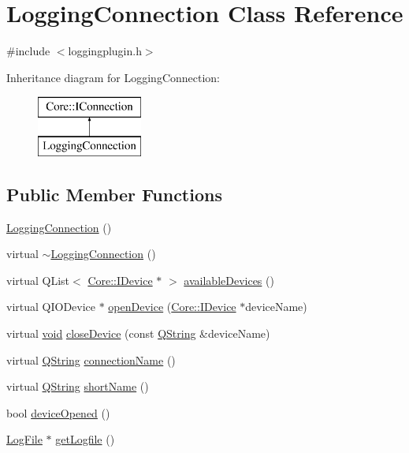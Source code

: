 \hypertarget{class_logging_connection}{\section{\-Logging\-Connection \-Class \-Reference}
\label{class_logging_connection}
}


{\ttfamily \#include $<$loggingplugin.\-h$>$}

\-Inheritance diagram for \-Logging\-Connection\-:\begin{figure}[H]
\begin{center}
\leavevmode
\includegraphics[height=2.000000cm]{class_logging_connection}
\end{center}
\end{figure}
\subsection*{\-Public \-Member \-Functions}
\begin{DoxyCompactItemize}
\item 
\hyperlink{group___logging_ga4e4cd5c90f83710ae2807a8257db1c70}{\-Logging\-Connection} ()
\item 
virtual \hyperlink{group___logging_ga0d9d6cd072a5b35292b5e4ffeda50fcd}{$\sim$\-Logging\-Connection} ()
\item 
virtual \-Q\-List$<$ \hyperlink{class_core_1_1_i_device}{\-Core\-::\-I\-Device} $\ast$ $>$ \hyperlink{group___logging_ga0ed63dc5111dcd536bacc7655b878e8f}{available\-Devices} ()
\item 
virtual \-Q\-I\-O\-Device $\ast$ \hyperlink{group___logging_ga592075585208489ed59844d9d7175015}{open\-Device} (\hyperlink{class_core_1_1_i_device}{\-Core\-::\-I\-Device} $\ast$device\-Name)
\item 
virtual \hyperlink{group___u_a_v_objects_plugin_ga444cf2ff3f0ecbe028adce838d373f5c}{void} \hyperlink{group___logging_gaeb291639744d4248ab7422d57444ea0a}{close\-Device} (const \hyperlink{group___u_a_v_objects_plugin_gab9d252f49c333c94a72f97ce3105a32d}{\-Q\-String} \&device\-Name)
\item 
virtual \hyperlink{group___u_a_v_objects_plugin_gab9d252f49c333c94a72f97ce3105a32d}{\-Q\-String} \hyperlink{group___logging_gaca41f5a7a58289c24cdf4975b9718091}{connection\-Name} ()
\item 
virtual \hyperlink{group___u_a_v_objects_plugin_gab9d252f49c333c94a72f97ce3105a32d}{\-Q\-String} \hyperlink{group___logging_gaf569eb0407d501102e1257c067a05295}{short\-Name} ()
\item 
bool \hyperlink{class_logging_connection_a93a0206c7700583ac02392c6b7f254a4}{device\-Opened} ()
\item 
\hyperlink{class_log_file}{\-Log\-File} $\ast$ \hyperlink{class_logging_connection_ae125e5d696178c272287548b0707f9ce}{get\-Logfile} ()
\end{DoxyCompactItemize}
